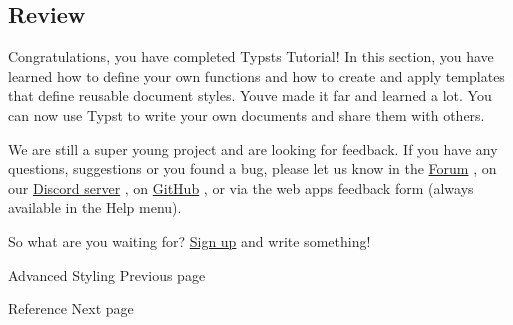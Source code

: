 \subsection{Review}\label{review}

Congratulations, you have completed Typst\textquotesingle s Tutorial! In
this section, you have learned how to define your own functions and how
to create and apply templates that define reusable document styles.
You\textquotesingle ve made it far and learned a lot. You can now use
Typst to write your own documents and share them with others.

We are still a super young project and are looking for feedback. If you
have any questions, suggestions or you found a bug, please let us know
in the \href{https://forum.typst.app/}{Forum} , on our
\href{https://discord.gg/2uDybryKPe}{Discord server} , on
\href{https://github.com/typst/typst/}{GitHub} , or via the web
app\textquotesingle s feedback form (always available in the Help menu).

So what are you waiting for? \href{https://typst.app}{Sign up} and write
something!

\href{/docs/tutorial/advanced-styling/}{\pandocbounded{}}

{ Advanced Styling } { Previous page }

\href{/docs/reference/}{\pandocbounded{}}

{ Reference } { Next page }
